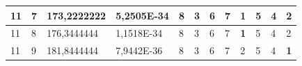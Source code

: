 \documentclass[conference]{IEEEtran}
\begin{document}
\begin{table}[]
\begin{tabular}{|llll|llllllll|}
\multicolumn{1}{|l|}{11}                                                             & \multicolumn{1}{l|}{7}                                                                 & \multicolumn{1}{l|}{173,2222222}                                                           & 5,2505E-34                              & \multicolumn{1}{l|}{8}                                                           & \multicolumn{1}{l|}{3}                                                           & \multicolumn{1}{l|}{6}                                                           & \multicolumn{1}{l|}{7}                                                           & \multicolumn{1}{l|}{\textbf{1}}                                                  & \multicolumn{1}{l|}{5}                                                           & \multicolumn{1}{l|}{4}                                                           & 2                                   \\ \hline
\multicolumn{1}{|l|}{11}                                                             & \multicolumn{1}{l|}{8}                                                                 & \multicolumn{1}{l|}{176,3444444}                                                           & 1,1518E-34                              & \multicolumn{1}{l|}{8}                                                           & \multicolumn{1}{l|}{3}                                                           & \multicolumn{1}{l|}{6}                                                           & \multicolumn{1}{l|}{7}                                                           & \multicolumn{1}{l|}{\textbf{1}}                                                  & \multicolumn{1}{l|}{5}                                                           & \multicolumn{1}{l|}{4}                                                           & 2                                   \\ \hline
\multicolumn{1}{|l|}{11}                                                             & \multicolumn{1}{l|}{9}                                                                 & \multicolumn{1}{l|}{181,8444444}                                                           & 7,9442E-36                              & \multicolumn{1}{l|}{8}                                                           & \multicolumn{1}{l|}{3}                                                           & \multicolumn{1}{l|}{6}                                                           & \multicolumn{1}{l|}{7}                                                           & \multicolumn{1}{l|}{2}                                                           & \multicolumn{1}{l|}{5}                                                           & \multicolumn{1}{l|}{4}                                                           & \textbf{1}                          \\ \hline

\end{tabular}
\end{table}
\end{document}
